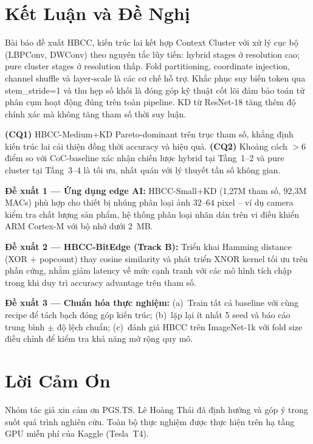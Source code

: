 \documentclass[journal]{IEEEtran}
\begin{document}
\section{Kết Luận và Đề Nghị}
\label{sec:conclusion}

Bài báo đề xuất HBCC, kiến trúc lai kết hợp Context Cluster với xử
lý cục bộ (LBPConv, DWConv) theo nguyên tắc lũy tiến: hybrid stages
ở resolution cao; pure cluster stages ở resolution thấp. Fold
partitioning, coordinate injection, channel shuffle và layer-scale là
các cơ chế hỗ trợ. Khắc phục suy biến token qua stem\_stride=1 và
thu hẹp số khối là đóng góp kỹ thuật cốt lõi đảm bảo toán tử phân
cụm hoạt động đúng trên toàn pipeline. KD từ ResNet-18 tăng thêm
độ chính xác mà không tăng tham số thời suy luận.

\noindent\textbf{(CQ1)} HBCC-Medium+KD Pareto-dominant trên trục tham
số, khẳng định kiến trúc lai cải thiện đồng thời accuracy và hiệu
quả. \textbf{(CQ2)} Khoảng cách $>$6 điểm so với CoC-baseline xác
nhận chiến lược hybrid tại Tầng~1--2 và pure cluster tại Tầng~3--4
là tối ưu, nhất quán với lý thuyết tần số không gian.

\noindent\textbf{Đề xuất 1 --- Ứng dụng edge AI:}
HBCC-Small+KD (1,27M tham số, 92,3M MACs) phù hợp cho thiết bị
nhúng phân loại ảnh $32$--$64$ pixel -- ví dụ camera kiểm tra chất
lượng sản phẩm, hệ thống phân loại nhãn dán trên vi điều khiển ARM
Cortex-M với bộ nhớ dưới 2~MB.

\noindent\textbf{Đề xuất 2 --- HBCC-BitEdge (Track B):}
Triển khai Hamming distance (XOR + popcount) thay cosine similarity
và phát triển XNOR kernel tối ưu trên phần cứng, nhằm giảm latency
về mức cạnh tranh với các mô hình tích chập trong khi duy trì
accuracy advantage trên tham số.

\noindent\textbf{Đề xuất 3 --- Chuẩn hóa thực nghiệm:}
(a)~Train tất cả baseline với cùng recipe để tách bạch đóng góp kiến
trúc; (b)~lặp lại ít nhất 5 seed và báo cáo trung bình $\pm$ độ
lệch chuẩn; (c)~đánh giá HBCC trên ImageNet-1k với fold size điều
chỉnh để kiểm tra khả năng mở rộng quy mô.

\section*{Lời Cảm Ơn}

Nhóm tác giả xin cảm ơn PGS.TS. Lê Hoàng Thái đã định hướng và góp
ý trong suốt quá trình nghiên cứu. Toàn bộ thực nghiệm được thực
hiện trên hạ tầng GPU miễn phí của Kaggle (Tesla~T4).

\clearpage


\end{document}

